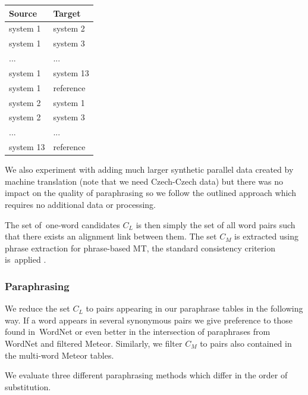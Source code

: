 \documentclass[11pt]{article}
\begin{document}
\begin{description}
\begin{center}
\begin{tabular}{ll}
Source & Target \\
\hline
system 1 & system 2 \\
system 1 & system 3 \\
... & ...\\
system 1 & system 13 \\
system 1 & reference \\
system 2 & system 1 \\
system 2 & system 3 \\
... & ... \\
system 13 & reference \\
\end{tabular}
\end{center}

We also experiment with adding much larger synthetic parallel data created by
machine translation (note that we need Czech-Czech data) but there was no impact
on the quality of paraphrasing so we follow the outlined approach which requires
no additional data or processing.

The set of~one-word candidates $C_L$ is then simply the set of all word pairs such
that there exists an alignment link between them. The set $C_M$ is extracted
using phrase extraction for phrase-based MT, the standard consistency criterion
is~applied \cite{Och99improvedalignment}.
\end{description}

\subsubsection{Paraphrasing}
We reduce the set $ C_{L} $ to pairs appearing in our paraphrase tables in the 
following way. If a word appears in several synonymous pairs we give preference 
to those found in~WordNet or even better in the intersection of paraphrases from 
WordNet and filtered Meteor. Similarly, we filter $ C_{M} $ to pairs also contained 
in the multi-word Meteor tables.

We evaluate three different paraphrasing methods which differ in the order of
substitution.
\end{document}

